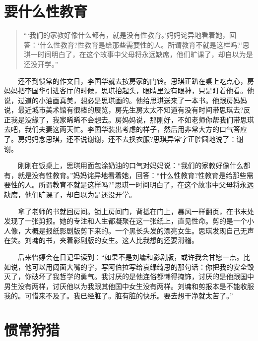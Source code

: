 \documentclass[12pt,UTF8]{ctexbook}
\begin{document}
\hypertarget{ux8981ux4ec0ux4e48ux6027ux6559ux80b2}{%
\section*{要什么性教育}\label{ux8981ux4ec0ux4e48ux6027ux6559ux80b2}}

\begin{quote}
\enquote{\enquote{我们的家教好像什么都有，就是没有性教育。}妈妈诧异地看着她，回答：\enquote{什么性教育?性教育是给那些需要性的人。所谓教育不就是这样吗?}思琪一时间明白了，在这个故事中父母将永远缺席，他们旷课了，却自以为是还没开学。}
\end{quote}

　　还不到惯常的作文日，李国华就去按房家的门铃。思琪正趴在桌上吃点心，房妈妈把李国华引进客厅的时候，思琪抬起头，眼睛里没有眼神，只是盯着他看。他说，过道的小油画真美，想必是思琪画的。他给思琪送来了一本书。他跟房妈妈说，最近城市美术馆有很棒的展览，房先生房太太不知道有没有时间带思琪去?反正我是没缘了，我家晞晞不会想去。房妈妈说，那刚好，不如老师你帮我们带思琪去吧，我们夫妻这两天忙。李国华装出考虑的样子，然后用非常大方的口气答应了。房妈妈念思琪，还不说谢谢，还不去换衣服?思琪异常字正腔圆地说了：谢谢。

　　刚刚在饭桌上，思琪用面包涂奶油的口气对妈妈说：\enquote{我们的家教好像什么都有，就是没有性教育。}妈妈诧异地看着她，回答：\enquote{什么性教育?性教育是给那些需要性的人。所谓教育不就是这样吗?}思琪一时间明白了，在这个故事中父母将永远缺席，他们旷课了，却自以为是还没开学。

　　拿了老师的书就回房间。锁上房间门，背抵在门上，暴风一样翻页，在书末处发现了一张剪报。她的专注和人生都凝聚在这一张纸上，直见性命。剪的是一个小人像，大概是报纸影剧版剪下来的。一个黑长头发的漂亮女生。思琪发现自己无声在笑。刘墉的书，夹着影剧版的女生。这人比我想的还要滑稽。

　　后来怡婷会在日记里读到：\enquote{如果不是刘墉和影剧版，或许我会甘愿一点。比如说，他可以用阔面大嘴的字，写阿伯拉写给哀绿绮思的那句话：你把我的安全毁灭了，你破坏了我哲学的勇气。我讨厌的是他连俗都懒得掩饰，讨厌的是他跟国中男生没有两样，讨厌他以为我跟其他国中女生没有两样。刘墉和剪报本是不能收服我的。可惜来不及了。我已经脏了。脏有脏的快乐。要去想干净就太苦了。}

\hypertarget{ux60efux5e38ux72e9ux730e}{%
\section*{惯常狩猎}\label{ux60efux5e38ux72e9ux730e}}
\end{document}
